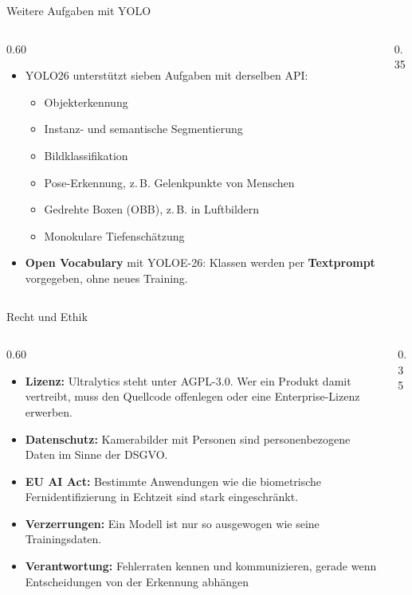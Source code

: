 \begin{frame}{Weitere Aufgaben mit YOLO}
\footnotesize
{}
\begin{columns}
\begin{column}{0.60\textwidth}
\begin{itemize}
  \item YOLO26 unterstützt sieben Aufgaben mit derselben API:
  \begin{itemize}
    \item Objekterkennung
    \item Instanz- und semantische Segmentierung
    \item Bildklassifikation
    \item Pose-Erkennung, z.\,B. Gelenkpunkte von Menschen
    \item Gedrehte Boxen (OBB), z.\,B. in Luftbildern
    \item Monokulare Tiefenschätzung
  \end{itemize}
  \item \textbf{Open Vocabulary} mit YOLOE-26: Klassen werden per \textbf{Textprompt} vorgegeben, ohne neues Training.
\end{itemize}
\end{column}
\begin{column}{0.35\textwidth}
\centering
{}
\end{column}
\end{columns}
\end{frame}

\begin{frame}{Recht und Ethik}
\footnotesize
{}
\begin{columns}
\begin{column}{0.60\textwidth}
\begin{itemize}
  \item \textbf{Lizenz:} Ultralytics steht unter AGPL-3.0. Wer ein Produkt damit vertreibt, muss den Quellcode offenlegen oder eine Enterprise-Lizenz erwerben.
  \item \textbf{Datenschutz:} Kamerabilder mit Personen sind personenbezogene Daten im Sinne der DSGVO.
  \item \textbf{EU AI Act:} Bestimmte Anwendungen wie die biometrische Fernidentifizierung in Echtzeit sind stark eingeschränkt.
  \item \textbf{Verzerrungen:} Ein Modell ist nur so ausgewogen wie seine Trainingsdaten.
  \item \textbf{Verantwortung:} Fehlerraten kennen und kommunizieren, gerade wenn Entscheidungen von der Erkennung abhängen
\end{itemize}
\end{column}
\begin{column}{0.35\textwidth}
\centering
{}
\end{column}
\end{columns}
\end{frame}

